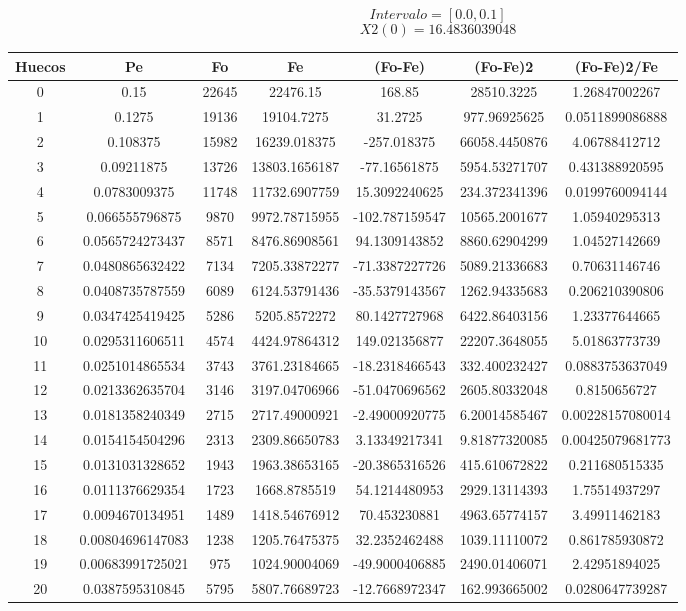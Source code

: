 \documentclass{article}
\begin{document}
$$
Intervalo = [0.0, 0.1]
$$
$$
X2(0) = 16.4836039048
$$
\begin{tabular}{|c|c|c|c|c|c|c|}
Huecos&Pe&Fo&Fe&(Fo{-}Fe)&(Fo{-}Fe)2&(Fo{-}Fe)2/Fe\\
\hline
0&0.15&22645&22476.15&168.85&28510.3225&1.26847002267\\
\hline
1&0.1275&19136&19104.7275&31.2725&977.96925625&0.0511899086888\\
\hline
2&0.108375&15982&16239.018375&{-}257.018375&66058.4450876&4.06788412712\\
\hline
3&0.09211875&13726&13803.1656187&{-}77.16561875&5954.53271707&0.431388920595\\
\hline
4&0.0783009375&11748&11732.6907759&15.3092240625&234.372341396&0.0199760094144\\
\hline
5&0.066555796875&9870&9972.78715955&{-}102.787159547&10565.2001677&1.05940295313\\
\hline
6&0.0565724273437&8571&8476.86908561&94.1309143852&8860.62904299&1.04527142669\\
\hline
7&0.0480865632422&7134&7205.33872277&{-}71.3387227726&5089.21336683&0.70631146746\\
\hline
8&0.0408735787559&6089&6124.53791436&{-}35.5379143567&1262.94335683&0.206210390806\\
\hline
9&0.0347425419425&5286&5205.8572272&80.1427727968&6422.86403156&1.23377644665\\
\hline
10&0.0295311606511&4574&4424.97864312&149.021356877&22207.3648055&5.01863773739\\
\hline
11&0.0251014865534&3743&3761.23184665&{-}18.2318466543&332.400232427&0.0883753637049\\
\hline
12&0.0213362635704&3146&3197.04706966&{-}51.0470696562&2605.80332048&0.8150656727\\
\hline
13&0.0181358240349&2715&2717.49000921&{-}2.49000920775&6.20014585467&0.00228157080014\\
\hline
14&0.0154154504296&2313&2309.86650783&3.13349217341&9.81877320085&0.00425079681773\\
\hline
15&0.0131031328652&1943&1963.38653165&{-}20.3865316526&415.610672822&0.211680515335\\
\hline
16&0.0111376629354&1723&1668.8785519&54.1214480953&2929.13114393&1.75514937297\\
\hline
17&0.0094670134951&1489&1418.54676912&70.453230881&4963.65774157&3.49911462183\\
\hline
18&0.00804696147083&1238&1205.76475375&32.2352462488&1039.11110072&0.861785930872\\
\hline
19&0.00683991725021&975&1024.90004069&{-}49.9000406885&2490.01406071&2.42951894025\\
\hline
20&0.0387595310845&5795&5807.76689723&{-}12.7668972347&162.993665002&0.0280647739287\\
\end{tabular}
\end{document}
